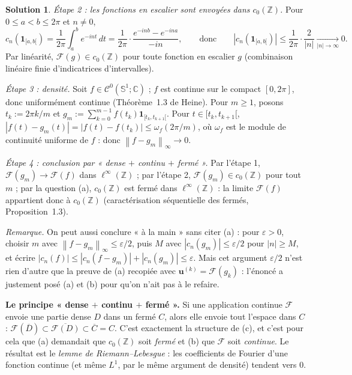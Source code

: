 \documentclass[11pt,a4paper]{article}
\newcommand{\Z}{\mathbb{Z}}
\newcommand{\C}{\mathbb{C}}
\newcommand{\Sun}{\mathbb{S}^1}
\newcommand{\adh}[1]{\overline{#1}}
\newcommand{\norm}[1]{\left\|#1\right\|}
\newcommand{\Cz}{\mathcal{C}^0}
\theoremstyle{definition}
\newtheorem*{solution}{Solution}
\begin{document}
\begin{solution}
\emph{Étape 2 : les fonctions en escalier sont envoyées dans $c_0(\Z)$.} Pour $0\le a<b\le2\pi$ et $n\ne0$,
\[
c_n(\mathbf 1_{[a,b[})=\frac1{2\pi}\int_a^be^{-int}\,dt=\frac1{2\pi}\cdot\frac{e^{-inb}-e^{-ina}}{-in},
\qquad\text{donc}\qquad
|c_n(\mathbf 1_{[a,b[})|\le\frac1{2\pi}\cdot\frac2{|n|}\xrightarrow[|n|\to\infty]{}0 .
\]
Par linéarité, $\mathcal F(g)\in c_0(\Z)$ pour toute fonction en escalier $g$ (combinaison linéaire finie d'indicatrices d'intervalles).

\emph{Étape 3 : densité.} Soit $f\in\Cz(\Sun;\C)$ ; $f$ est continue sur le compact $[0,2\pi]$, donc uniformément continue (Théorème~1.3 de Heine). Pour $m\ge1$, posons $t_k:=2\pi k/m$ et $g_m:=\sum_{k=0}^{m-1}f(t_k)\mathbf 1_{[t_k,t_{k+1}[}$. Pour $t\in[t_k,t_{k+1}[$, $|f(t)-g_m(t)|=|f(t)-f(t_k)|\le\omega_f(2\pi/m)$, où $\omega_f$ est le module de continuité uniforme de $f$ : donc $\norm{f-g_m}_\infty\to0$.

\emph{Étape 4 : conclusion par « dense $+$ continu $+$ fermé ».} Par l'étape 1, $\mathcal F(g_m)\to\mathcal F(f)$ dans $\ell^\infty(\Z)$ ; par l'étape 2, $\mathcal F(g_m)\in c_0(\Z)$ pour tout $m$ ; par la question (a), $c_0(\Z)$ est fermé dans $\ell^\infty(\Z)$ : la limite $\mathcal F(f)$ appartient donc à $c_0(\Z)$ (caractérisation séquentielle des fermés, Proposition~1.3).

\emph{Remarque.} On peut aussi conclure « à la main » sans citer (a) : pour $\varepsilon>0$, choisir $m$ avec $\norm{f-g_m}_\infty\le\varepsilon/2$, puis $M$ avec $|c_n(g_m)|\le\varepsilon/2$ pour $|n|\ge M$, et écrire $|c_n(f)|\le|c_n(f-g_m)|+|c_n(g_m)|\le\varepsilon$. Mais cet argument $\varepsilon/2$ n'est rien d'autre que la preuve de (a) recopiée avec $\mathbf u^{(k)}=\mathcal F(g_k)$ : l'énoncé a justement posé (a) et (b) pour qu'on n'ait pas à le refaire.
\end{solution}

\begin{pointcle}
\textbf{Le principe « dense $+$ continu $+$ fermé ».} Si une application continue $\mathcal F$ envoie une partie dense $D$ dans un fermé $C$, alors elle envoie tout l'espace dans $C$ : $\mathcal F(\adh D)\subset\adh{\mathcal F(D)}\subset\adh C=C$. C'est exactement la structure de (c), et c'est pour cela que (a) demandait que $c_0(\Z)$ soit \emph{fermé} et (b) que $\mathcal F$ soit \emph{continue}. Le résultat est le \emph{lemme de Riemann--Lebesgue} : les coefficients de Fourier d'une fonction continue (et même $L^1$, par le même argument de densité) tendent vers $0$.
\end{pointcle}
\end{document}
